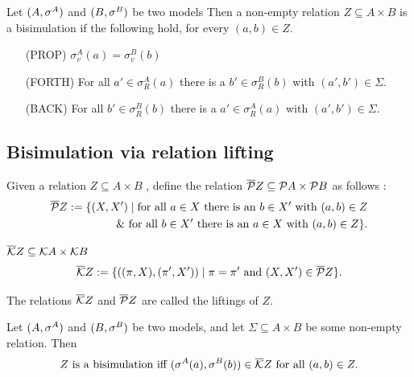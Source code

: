 Let $\pair[A,\sigma^{A}]$ and $\pair[B,\sigma^{B}]$ be two models
Then a non-empty relation $Z \subseteq A \times B$ is a bisimulation if the following hold, for every
$(a, b ) \in Z$.
\begin{enumerate}
\item[(PROP)] $\sigma^{A}_{v}(a)=\sigma^{B}_{v}(b)$
\item[(FORTH)] For all $a' \in \sigma^{A}_{R}(a)$ there is a $b' \in \sigma^{B}_{R}(b)$ with
  $(a',b') \in \Sigma$.
\item[(BACK)] For all $b' \in \sigma^{B}_{R}(b)$ there is a $a' \in \sigma^{A}_{R}(a)$ with
  $(a',b') \in \Sigma$.
\end{enumerate}

\subsection{Bisimulation via relation lifting}
\label{sec:bisim-via-relat}
\begin{definition}[$\overline \P(Z)$]
  \label{def:1}
  Given a relation $Z \subseteq A \times B$ , define the relation $\Plift Z \subseteq \P A \times \P B$
  as follows :
  \begin{align*}
    \Plift Z := \{(X, X' ) \mid \text{for all } a \in X \text{ there is an } b \in X'
    \text{ with } (a, b ) \in Z \\
    \& \text{ for all } b \in X' \text{ there is an } a \in X \text{ with } (a, b
    ) \in Z\}.
  \end{align*}
\end{definition}
\begin{definition}[$\overline \K(Z)$]
  \label{def:1}
   $\Klift Z \subseteq \K A\times\K B$
  \begin{align*}
    \Klift Z := \{((\pi,X), (\pi',X') ) \mid \pi=\pi' \text{ and } (X,X') \in \Plift Z \}.
  \end{align*}
\end{definition}
The relations $\Klift Z$ and $\Plift Z$ are called the liftings of $Z$.


\begin{proposition}
  \label{proof:1}
  Let $\pair[A,\sigma^{A}]$ and $\pair[B,\sigma^{B}]$ be two models, and let $\Sigma \subseteq A \times B$ be some non-empty relation.
  Then
  \[Z \text{ is a bisimulation iff } (\sigma^{A}(a),\sigma^{B}(b))\in \Klift Z \text{ for all }
    (a,b) \in Z.\]
  \end{proposition}

